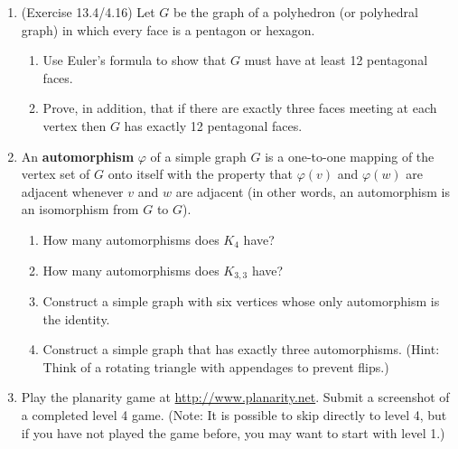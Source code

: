 \documentclass{article}
\begin{document}
\begin{enumerate}

\item (Exercise 13.4/4.16) Let $G$ be the graph of a polyhedron (or polyhedral graph) in which every face is a pentagon or hexagon.
\begin{enumerate}
	\item Use Euler's formula to show that $G$ must have at least 12 pentagonal faces.
	\item Prove, in addition, that if there are exactly three faces meeting at each vertex then $G$ has exactly 12 pentagonal faces.
\end{enumerate}

\item An {\bf automorphism} $\varphi$ of a simple graph $G$ is a one-to-one mapping of the vertex set of $G$ onto itself with the property that $\varphi(v)$ and $\varphi(w)$ are adjacent whenever $v$ and $w$ are adjacent (in other words, an automorphism is an isomorphism from $G$ to $G$).
\begin{enumerate}
	\item How many automorphisms does $K_4$ have?
	\item How many automorphisms does $K_{3,3}$ have?
	\item Construct a simple graph with six vertices whose only automorphism is the identity.
	\item Construct a simple graph that has exactly three automorphisms. (Hint: Think of a rotating triangle with appendages to prevent flips.)
\end{enumerate}

\item Play the planarity game at \url{http://www.planarity.net}. Submit a screenshot of a completed level 4 game. (Note: It is possible to skip directly to level 4, but if you have not played the game before, you may want to start with level 1.)
\end{enumerate}
\end{document}
